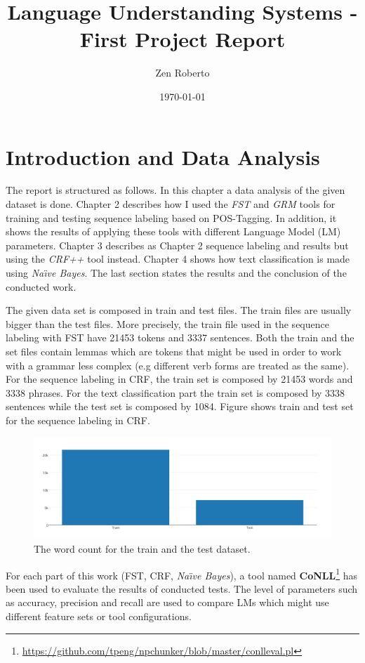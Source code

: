 \documentclass[a4paper,7pt,oneside]{book}
\author{Zen Roberto}
\title{Language Understanding Systems - First Project Report}
\date{\today}
\begin{document}



\chapter{Introduction and Data Analysis}

The report is structured as follows. In this chapter a data analysis of the given dataset is done. Chapter 2 describes how I used the \textit{FST} and \textit{GRM} tools for training and testing sequence labeling based on POS-Tagging. In addition, it shows the results of applying these tools with different Language Model (LM) parameters. Chapter 3 describes as Chapter 2 sequence labeling and results but using the \textit{CRF++} tool instead. Chapter 4 shows how text classification is made using \textit{Na\"{\i}ve Bayes}. The last section states the results and the conclusion of the conducted work.

The given data set is composed in train and test files. The train files are usually bigger than the test files. More precisely, the train file used in the sequence labeling with FST have 21453 tokens and 3337 sentences. Both the train and the set files contain lemmas which are tokens that might be used in order to work with a grammar less complex (e.g different verb forms are treated as the same). For the sequence labeling in CRF, the train set is composed by 21453 words and 3338 phrases. For the text classification part the train set is composed by 3338 sentences while the test set is composed by 1084. Figure \label{fig:crf_dataset} shows train and test set for the sequence labeling in CRF.

\begin{figure}[h!]
  \centering
    \includegraphics[scale=0.5]{res/crf_dataset_small}
    \caption{The word count for the train and the test dataset.}
    \label{fig:crf_dataset}
\end{figure}

\noindent
For each part of this work (FST, CRF, \textit{Na\"{\i}ve Bayes}), a tool named \textbf{CoNLL}\footnote{\url{https://github.com/tpeng/npchunker/blob/master/conlleval.pl}} has been used to evaluate the results of conducted tests. The level of parameters such as accuracy, precision and recall are used to compare LMs which might use different feature sets or tool configurations.
\end{document}
